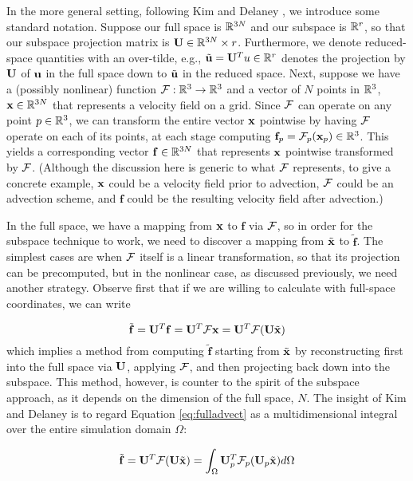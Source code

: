 In the more general setting, following Kim and Delaney \cite{Kim2013}, we introduce some standard notation. Suppose our full space is $\mathbb{R}^{3N}$ and our subspace is $\mathbb{R}^{r}$, so that our subspace 
projection matrix is $\mathbf{U} \in \mathbb{R}^{3N} \times r$. Furthermore, we denote reduced-space quantities with an over-tilde, e.g., $\tilde{\mathbf{u}} = \mathbf{U}^T u \in \mathbb{R}^{r}$ denotes the projection by $\mathbf{U}$ of $\mathbf{u}$ in the full space 
down to $\tilde{\mathbf{u}}$ in the reduced space. Next, suppose we have a (possibly nonlinear) function $\mathcal{F} : \mathbb{R}^3 \rightarrow \mathbb{R}^3$ and a vector of $N$ points in $\mathbb{R}^3$, $\mathbf{x} \in \mathbb{R}^{3N}$ that represents
a velocity field on a grid. Since $\mathcal{F}$ can operate on any point $p \in \mathbb{R}^3$, we can transform the entire vector $\mathbf{x}$ pointwise by having $\mathcal{F}$ operate on each of its points, at each stage computing $\mathbf{f}_p = \mathcal{F}_p(\mathbf{x}_p) \in \mathbb{R}^3$. This
yields a corresponding vector $\mathbf{f} \in \mathbb{R}^{3N}$ that represents $\mathbf{x}$ pointwise transformed by $\mathcal{F}$. (Although the discussion here is generic to what $\mathcal{F}$ represents, to give a concrete
example, $\mathbf{x}$ could be a velocity field prior to advection, $\mathcal{F}$ could be an advection scheme, and $\mathbf{f}$ could be the resulting velocity field after advection.)

In the full space, we have a mapping from $\mathbf{x}$ to $\mathbf{f}$ via $\mathcal{F}$, so in order for the subspace technique to work, we need to discover a mapping from $\tilde{\mathbf{x}}$ to $\tilde{\mathbf{f}}$. 
The simplest cases are when $\mathcal{F}$ itself is a linear transformation, so that its projection can be precomputed, but in the nonlinear case, as discussed previously, we need another strategy.
Observe first that if we are willing to calculate with full-space coordinates, we can write

\begin{equation}
\label{eq:fulladvect}
\tilde{\mathbf{f}} = \mathbf{U}^T \mathbf{f} = \mathbf{U}^T \mathcal{F} \mathbf{x} = \mathbf{U}^T \mathcal{F}(\mathbf{U}\tilde{\mathbf{x}})
\end{equation}
which implies a method from computing $\tilde{\mathbf{f}}$ starting from $\tilde{\mathbf{x}}$ by reconstructing first into the full space via $\mathbf{U}$, applying $\mathcal{F}$, and then projecting back
down into the subspace. This method, however, is counter to the spirit of the subspace approach, as it depends on the dimension of the full space, $N$. The insight of Kim and Delaney is to regard
Equation \ref{eq:fulladvect} as a multidimensional integral over the entire simulation domain $\Omega$:

\begin{equation}
\label{eq:integral}
\tilde{\mathbf{f}} = \mathbf{U}^T \mathcal{F}(\mathbf{U}\tilde{\mathbf{x}}) = \int_{\Omega} \mathbf{U}_p^T \mathcal{F}_p(\mathbf{U}_p \tilde{\mathbf{x}})d\Omega
\end{equation}

